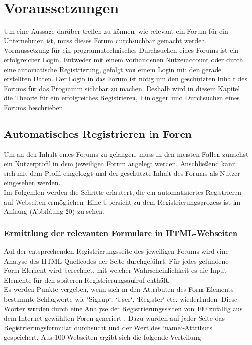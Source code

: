 \section{Voraussetzungen}
Um eine Aussage darüber treffen zu können, wie relevant ein Forum für ein Unternehmen ist, muss dieses Forum durchsuchbar gemacht werden.
Vorraussetzung für ein programmtechnisches Durchsuchen eines Forums ist ein erfolgreicher Login. Entweder mit einem vorhandenen Nutzeraccount oder durch eine automatische Registrierung, gefolgt von einem Login mit den gerade erstellten Daten.
Der Login in das Forum ist nötig um den geschützten Inhalt des Forums für das Programm sichtbar zu machen. Deshalb wird in diesem Kapitel die Theorie für ein erfolgreiches Registrieren, Einloggen und Durchsuchen eines Forums beschrieben.

\subsection {Automatisches Registrieren in Foren}
Um an den Inhalt eines Forums zu gelangen, muss in den meisten Fällen zunächst ein Nutzerprofil in dem jeweiligen Forum angelegt werden. Anschließend kann sich mit dem Profil eingeloggt und der geschützte Inhalt des Forums als Nutzer eingesehen werden. \\
Im Folgenden werden die Schritte erläutert, die ein automatisiertes Registrieren auf Webseiten ermöglichen.
Eine Übersicht zu dem Registrierungsprozess ist im Anhang (Abbildung 20) zu sehen.

\subsubsection{Ermittlung der relevanten Formulare in HTML-Webseiten}
Auf der entsprechenden Registrierungsseite des jeweiligen Forums wird eine Analyse des HTML-Quellcodes der Seite durchgeführt.
Für jedes gefundene Form-Element wird berechnet, mit welcher Wahrscheinlichkeit es die Input-Elemente für den späteren Registrierungsaufruf enthält. \\
Es werden Punkte vergeben, wenn sich in den Attributen des Form-Elements bestimmte Schlagworte wie `Signup`, `User`, `Register` etc. wiederfinden.
Diese Wörter wurden durch eine Analyse der Registrierungsseiten von 100 zufällig aus dem Internet gewählten Foren generiert . Dazu wurden auf jeder Seite das Registrierungsformular durchsucht und der Wert des `name`-Attributs gespeichert. Aus 100 Webseiten ergibt sich die folgende Verteilung:

